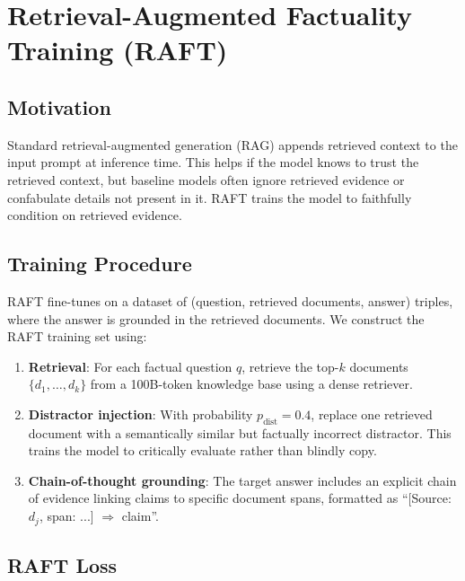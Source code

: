 \documentclass[11pt,a4paper]{article}
\begin{document}
\section{Retrieval-Augmented Factuality Training (RAFT)}
\label{sec:raft}

\subsection{Motivation}

Standard retrieval-augmented generation (RAG) appends retrieved context to the input
prompt at inference time. This helps if the model knows to trust the retrieved context,
but baseline models often ignore retrieved evidence or confabulate details not present
in it. RAFT trains the model to faithfully condition on retrieved evidence.

\subsection{Training Procedure}

RAFT fine-tunes on a dataset of (question, retrieved documents, answer) triples, where
the answer is grounded in the retrieved documents. We construct the RAFT training set
using:

\begin{enumerate}
    \item \textbf{Retrieval}: For each factual question $q$, retrieve the top-$k$ documents
          $\{d_1, \ldots, d_k\}$ from a 100B-token knowledge base using a dense retriever.
    \item \textbf{Distractor injection}: With probability $p_{\text{dist}} = 0.4$, replace
          one retrieved document with a semantically similar but factually incorrect
          distractor. This trains the model to critically evaluate rather than blindly copy.
    \item \textbf{Chain-of-thought grounding}: The target answer includes an explicit
          chain of evidence linking claims to specific document spans, formatted as
          ``[Source: $d_j$, span: ...] $\Rightarrow$ claim''.
\end{enumerate}

\subsection{RAFT Loss}
\end{document}

